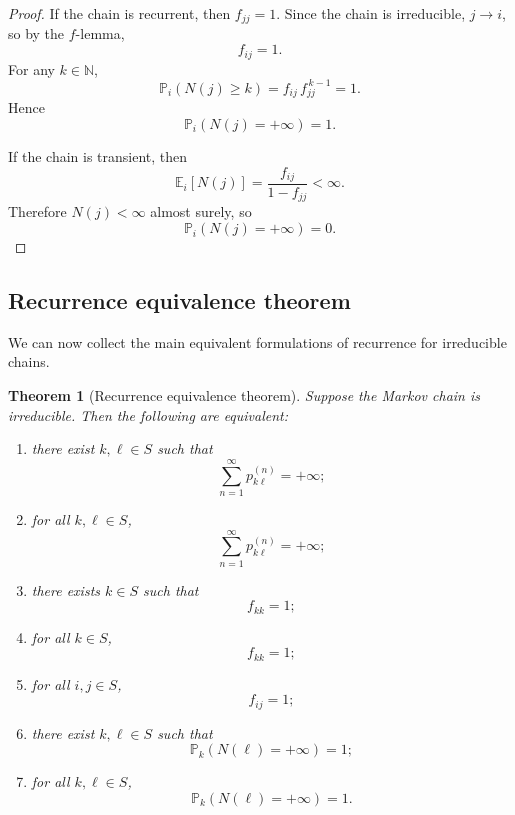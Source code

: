 \documentclass[11pt]{article}
\newtheorem{theorem}{Theorem}[section]
\theoremstyle{definition}
\begin{document}
\begin{proof}
If the chain is recurrent, then \(f_{jj}=1\). Since the chain is irreducible, \(j\to i\), so by the \(f\)-lemma,
\[
f_{ij}=1.
\]
For any \(k\in\mathbb N\),
\[
\mathbb P_i(N(j)\ge k)
=
f_{ij}\,f_{jj}^{\,k-1}
=
1.
\]
Hence
\[
\mathbb P_i(N(j)=+\infty)=1.
\]

If the chain is transient, then
\[
\mathbb E_i[N(j)]
=
\frac{f_{ij}}{1-f_{jj}}
<\infty.
\]
Therefore \(N(j)<\infty\) almost surely, so
\[
\mathbb P_i(N(j)=+\infty)=0.
\]
\end{proof}

\subsection{Recurrence equivalence theorem}

We can now collect the main equivalent formulations of recurrence for irreducible chains.

\begin{theorem}[Recurrence equivalence theorem]
Suppose the Markov chain is irreducible. Then the following are equivalent:
\begin{enumerate}[label=(\roman*)]
    \item there exist \(k,\ell\in S\) such that
    \[
    \sum_{n=1}^\infty p_{k\ell}^{(n)}=+\infty;
    \]
    \item for all \(k,\ell\in S\),
    \[
    \sum_{n=1}^\infty p_{k\ell}^{(n)}=+\infty;
    \]
    \item there exists \(k\in S\) such that
    \[
    f_{kk}=1;
    \]
    \item for all \(k\in S\),
    \[
    f_{kk}=1;
    \]
    \item for all \(i,j\in S\),
    \[
    f_{ij}=1;
    \]
    \item there exist \(k,\ell\in S\) such that
    \[
    \mathbb P_k(N(\ell)=+\infty)=1;
    \]
    \item for all \(k,\ell\in S\),
    \[
    \mathbb P_k(N(\ell)=+\infty)=1.
    \]
\end{enumerate}
\end{theorem}
\end{document}
